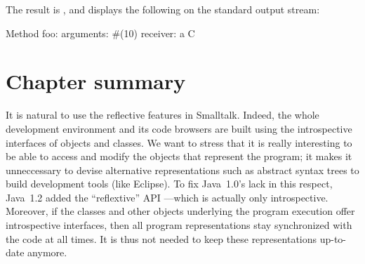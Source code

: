 \documentclass[a4paper,10pt,twoside]{book}
\begin{document}
The result is , and displays the following on the standard output stream:

\begin{code}{}
Method foo: arguments: #(10) receiver: a C
\end{code}

\section{Chapter summary}

It is natural to use the reflective features in Smalltalk.
Indeed, the whole development environment and its code browsers are built using the introspective interfaces of objects and classes.
We want to stress that it is really interesting to be able to access and modify the objects that represent the program; it makes it unneccessary to devise alternative representations such as abstract syntax trees to build development tools (like Eclipse).
To fix Java~1.0's lack in this respect, Java~1.2 added the ``reflextive'' API ---which is actually only introspective.
Moreover, if the classes and other objects underlying the program execution offer introspective interfaces, then all program representations stay synchronized with the code at all times.
It is thus not needed to keep these representations up-to-date anymore.



\ifx\wholebook\relax\else
\end{document}
